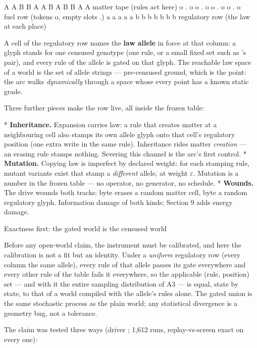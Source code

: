 \medskip
\begtt
A A B B A A B A B B A A     matter tape (rules act here)
o . o o . o o . o o . o     fuel row (tokens o, empty slots .)
a a a a a b b b b b b b     regulatory row (the law at each place)
\endtt
\medskip

\noindent A cell of the regulatory row names the {\bf law allele}
in force at that column: a glyph stands for one censused genotype
(one rule, or a small fixed set such as \lb's pair), and every rule
of the allele is gated on that glyph. The reachable law space of a
world is the set of allele strings --- pre-censused ground, which
is the point: the arc walks {\it dynamically} through a space whose
every point has a known static grade.

Three further pieces make the row live, all inside the frozen
table:

\begitems
* {\bf Inheritance.} Expansion carries law: a rule that creates
matter at a neighbouring cell also stamps its own allele glyph
onto that cell's regulatory position (one extra write in the same
rule). Inheritance rides matter {\it creation} --- an erasing rule
stamps nothing. Severing this channel is the arc's first control.
* {\bf Mutation.} Copying law is imperfect by declared weight: for
each stamping rule, mutant variants exist that stamp a {\it
different} allele, at weight $\varepsilon$. Mutation is a number
in the frozen table --- no operator, no generator, no schedule.
* {\bf Wounds.} The drive wounds both tracks: byte  erases a
random matter cell, byte  a random regulatory glyph.
Information damage of both kinds; Section 9 adds energy damage.
\enditems

\sec Exactness first: the gated world is the censused world

Before any open-world claim, the instrument must be calibrated,
and here the calibration is not a fit but an identity. Under a
{\it uniform} regulatory row (every column the same allele), every
rule of that allele passes its gate everywhere and every other
rule of the table fails it everywhere, so the applicable
(rule, position) set --- and with it the entire sampling
distribution of A3 --- is equal, state by state, to that of a
world compiled with the allele's rules alone. The gated union is
the same stochastic process as the plain world; any statistical
divergence is a geometry bug, not a tolerance.

The claim was tested three ways (driver ; 1{,}612
runs, replay-vs-screen exact on every one):

